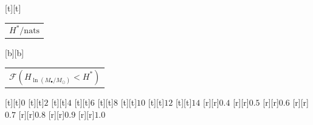 %    
%
%
\begin{psfrags}%
\psfragscanon%
%
[t][t]{\color[rgb]{0,0,0}\setlength{\tabcolsep}{0pt}\begin{tabular}{c}{\Large$H^\ast/\mathrm{nats}$}\end{tabular}}%
[b][b]{\color[rgb]{0,0,0}\setlength{\tabcolsep}{0pt}\begin{tabular}{c}{\Large$\mathcal{F}(H_{\ln(M_\bullet/M_\odot)} < H^\ast)$}\end{tabular}}%
%
[t][t]{$0$}%
[t][t]{$2$}%
[t][t]{$4$}%
[t][t]{$6$}%
[t][t]{$8$}%
[t][t]{$10$}%
[t][t]{$12$}%
[t][t]{$14$}%
%
[r][r]{$0.4$}%
[r][r]{$0.5$}%
[r][r]{$0.6$}%
[r][r]{$0.7$}%
[r][r]{$0.8$}%
[r][r]{$0.9$}%
[r][r]{$1.0$}%
%
%
\end{psfrags}%
%
